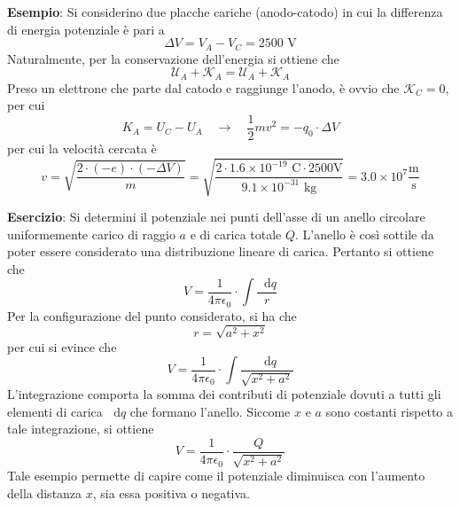 \documentclass[a4paper]{extarticle}
\newcommand\dif{\mathop{}\!\mathrm{d}}
\begin{document}
\vspace{1em}
\noindent
\textbf{Esempio}: Si considerino due placche cariche (anodo-catodo) in cui la differenza di energia potenziale è pari a
\[\Delta V = V_A-V_C=2500 \text{ V}\]
Naturalmente, per la conservazione dell'energia si ottiene che
\[\mathcal{U}_A+\mathcal{K}_A=\mathcal{U}_A+\mathcal{K}_A\]
Preso un elettrone che parte dal catodo e raggiunge l'anodo, è ovvio che $\mathcal{K}_C=0$, per cui
\[K_A=U_C-U_A \hspace{1em} \rightarrow \hspace{1em} \frac{1}{2}mv^2 = - q_0 \cdot \Delta V\]
per cui la velocità cercata è
\[v = \sqrt{\frac{2 \cdot (-e) \cdot (-\Delta V)}{m}} = \sqrt{\frac{2 \cdot 1.6 \times 10^{-19} \text{ C} \cdot 2500 \text{V}}{9.1 \times 10^{-31} \text{ kg}}} = 3.0 \times 10^7 \frac{\text{m}}{\text{s}}\]

\vspace{1em}
\noindent
\textbf{Esercizio}: Si determini il potenziale nei punti dell'asse di un anello circolare uniformemente carico di raggio $a$ e di carica totale $Q$. L'anello è così sottile da poter essere considerato una distribuzione lineare di carica. Pertanto si ottiene che
\[V=\frac{1}{4 \pi \epsilon_0} \cdot \int \frac{\dif q}{r}\]
Per la configurazione del punto considerato, si ha che
\[r=\sqrt{a^2+x^2}\]
per cui si evince che
\[V=\frac{1}{4 \pi \epsilon_0} \cdot \int \frac{\dif q}{\sqrt{x^2+a^2}}\]
L'integrazione comporta la somma dei contributi di potenziale dovuti a tutti gli elementi di carica $\dif q$ che formano l'anello. Siccome $x$ e $a$ sono costanti rispetto a tale integrazione, si ottiene
\[V= \frac{1}{4 \pi \epsilon_0} \cdot \frac{Q}{\sqrt{x^2+a^2}}\]
Tale esempio permette di capire come il potenziale diminuisca con l'aumento della distanza $x$, sia essa positiva o negativa.

\vspace{1em}
\noindent
\end{document}
